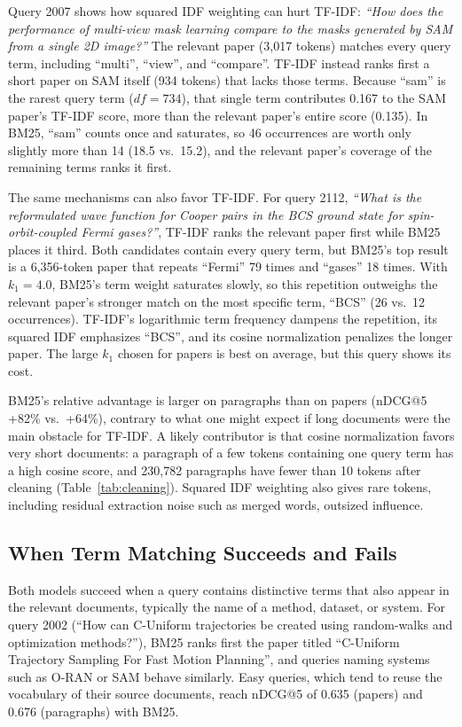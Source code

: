 \documentclass[sigconf,nonacm]{acmart}
\begin{document}
Query 2007 shows how squared IDF weighting can hurt TF-IDF: \textit{``How does
the performance of multi-view mask learning compare to the masks generated by
SAM from a single 2D image?''} The relevant paper (3,017 tokens) matches every
query term, including ``multi'', ``view'', and ``compare''. TF-IDF instead ranks
first a short paper on SAM itself (934 tokens) that lacks those terms. Because 
``sam'' is the rarest query term ($\mathit{df} = 734$), that single term contributes
0.167 to the SAM paper's TF-IDF score, more than the relevant paper's entire score
(0.135). In BM25, ``sam'' counts once and saturates, so 46 occurrences are worth only 
slightly more than 14 (18.5 vs.\ 15.2), and the relevant paper's coverage of the remaining
terms ranks it first.

The same mechanisms can also favor TF-IDF. For query 2112, \textit{``What is the
reformulated wave function for Cooper pairs in the BCS ground state for 
spin-orbit-coupled Fermi gases?''}, TF-IDF ranks the relevant paper first while BM25 
places it third. Both candidates contain every query term, but BM25's top result is 
a 6,356-token paper that repeats ``Fermi'' 79 times and ``gases'' 18 times. With 
$k_1 = 4.0$, BM25's term weight saturates slowly, so this repetition outweighs the 
relevant paper's stronger match on the most specific term, ``BCS'' (26 vs.\ 12 
occurrences). TF-IDF's logarithmic term frequency dampens the repetition, its squared
IDF emphasizes ``BCS'', and its cosine normalization penalizes the longer paper. The 
large $k_1$ chosen for papers is best on average, but this query shows its cost.

BM25's relative advantage is larger on paragraphs than on papers (nDCG@5 +82\% vs.\ 
+64\%), contrary to what one might expect if long documents were the main obstacle
for TF-IDF. A likely contributor is that cosine normalization favors very short 
documents: a paragraph of a few tokens containing one query term has a high cosine
score, and 230,782 paragraphs have fewer than 10 tokens after cleaning (Table~\ref{tab:cleaning}).
Squared IDF weighting also gives rare tokens, including residual extraction noise such as 
merged words, outsized influence.

\subsection{When Term Matching Succeeds and Fails}
\label{sec:failures}

Both models succeed when a query contains distinctive terms that also appear in the 
relevant documents, typically the name of a method, dataset, or system. For query 2002 
(``How can C-Uniform trajectories be created using random-walks and optimization methods?''), 
BM25 ranks first the paper titled ``C-Uniform Trajectory Sampling For Fast Motion Planning'', 
and queries naming systems such as O-RAN or SAM behave similarly. Easy queries, which tend to
reuse the vocabulary of their source documents, reach nDCG@5 of 0.635 (papers) and 0.676 (paragraphs)
with BM25.
\end{document}
